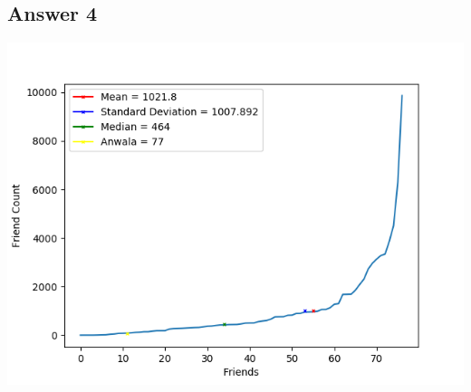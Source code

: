 \documentclass[10pt,letterpaper]{article}
\begin{document}
\subsection{Answer 4}
\includegraphics[scale=1]{Question4.png}
\pagebreak
\end{document}
